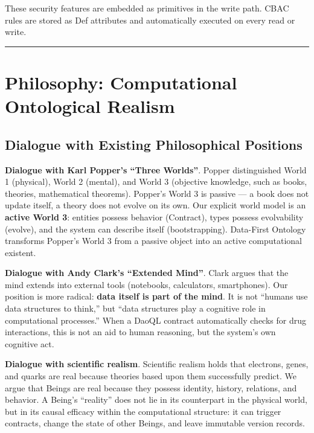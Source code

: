 \documentclass[11pt,a4paper]{article}
\begin{document}
These security features are embedded as primitives in the write path.
CBAC rules are stored as Def attributes and automatically executed on
every read or write.

\begin{center}\rule{0.5\linewidth}{0.5pt}\end{center}

\section{Philosophy: Computational Ontological
Realism}\label{philosophy-computational-ontological-realism}

\subsection{Dialogue with Existing Philosophical
Positions}\label{dialogue-with-existing-philosophical-positions}

\textbf{Dialogue with Karl Popper's ``Three Worlds''}. Popper
distinguished World 1 (physical), World 2 (mental), and World 3
(objective knowledge, such as books, theories, mathematical theorems).
Popper's World 3 is passive --- a book does not update itself, a theory
does not evolve on its own. Our explicit world model is an
\textbf{active World 3}: entities possess behavior (Contract), types
possess evolvability (evolve), and the system can describe itself
(bootstrapping). Data-First Ontology transforms Popper's World 3 from a
passive object into an active computational existent.

\textbf{Dialogue with Andy Clark's ``Extended Mind''}. Clark argues that
the mind extends into external tools (notebooks, calculators,
smartphones). Our position is more radical: \textbf{data itself is part
of the mind}. It is not ``humans use data structures to think,'' but
``data structures play a cognitive role in computational processes.''
When a DaoQL contract automatically checks for drug interactions, this
is not an aid to human reasoning, but the system's own cognitive act.

\textbf{Dialogue with scientific realism}. Scientific realism holds that
electrons, genes, and quarks are real because theories based upon them
successfully predict. We argue that Beings are real because they possess
identity, history, relations, and behavior. A Being's ``reality'' does
not lie in its counterpart in the physical world, but in its causal
efficacy within the computational structure: it can trigger contracts,
change the state of other Beings, and leave immutable version records.
\end{document}
